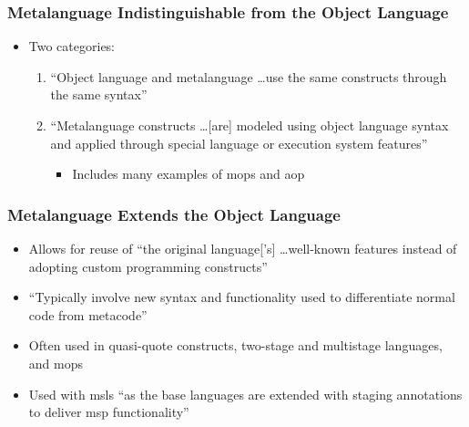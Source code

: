 \subsubsection{Metalanguage Indistinguishable from the Object Language
      \citep[p.~113:28-29]{lilis_survey_2019}}
\begin{itemize}
      \item Two categories:
            \begin{enumerate}
                  \item ``Object language and metalanguage \dots use the same
                        constructs through the same syntax''
                  \item ``Metalanguage constructs \dots [are] modeled using
                        object language syntax and applied through special
                        language or execution system features''
                        \citep[p.~113:28]{lilis_survey_2019}
                        \begin{itemize}
                              \item Includes many examples of \acsp{mop} and
                                    \acs{aop} \citep[p.~113:28]{lilis_survey_2019}
                        \end{itemize}
            \end{enumerate}
\end{itemize}

\subsubsection{Metalanguage Extends the Object Language
      \citep[p.~113:29]{lilis_survey_2019}}
\begin{itemize}
      \item Allows for reuse of ``the original language['s] \dots well-known
            features instead of adopting custom programming constructs''
            \citep[p.~113:29]{lilis_survey_2019}
      \item ``Typically involve new syntax and functionality used to
            differentiate normal code from metacode''
            \citep[p.~113:29]{lilis_survey_2019}
      \item Often used in quasi-quote constructs, two-stage and multistage
            languages, and \acsp{mop} \citep[p.~113:29]{lilis_survey_2019}
      \item Used with \acsp{msl} ``as the base languages are extended with
            staging annotations to deliver \acs{msp} functionality''
            \citep[p.~113:31]{lilis_survey_2019}
\end{itemize}

